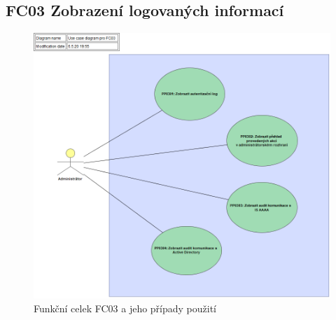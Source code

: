 \documentclass[thesis=M,czech]{FITthesis}[2019/12/23]
\begin{document}
\subsection{FC03 Zobrazení logovaných informací}
\label{FC03}
\begin{figure}[H]
  \centering
  \includegraphics[width=\textwidth]{res/design/Use case diagram pro FC03.png}
  \caption{Funkční celek FC03 a jeho případy použití}
  \label{fig:Funkční celek FC03 a jeho případy použití}
\end{figure}

\newpage
\end{document}
